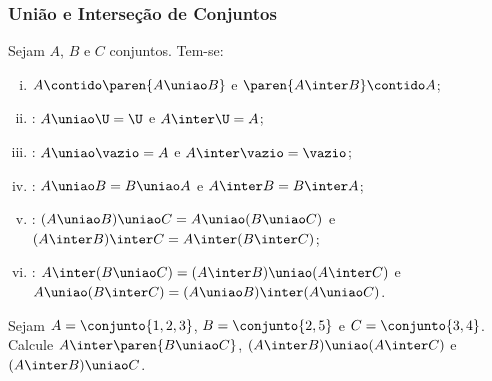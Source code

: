 \begin{frame}
	\frametitle{União e Interseção de Conjuntos} 
	
	\begin{proposicao}
		\label{propuniaoint}
		Sejam $A$, $B$ e $C$ conjuntos. Tem-se:
		\begin{enumerate}[i.]
			\item $A \contido \paren{A \uniao B}$ e $\paren{A \inter B} \contido A$;
			\item {}: $A \uniao \U = \U$ e $A \inter \U = A$;
			\item {}: $A \uniao \vazio = A$ e $A \inter \vazio = \vazio$;
			\item {}: $A \uniao B = B \uniao A$ e $A \inter B = B \inter A$;
			\item {}: $(A \uniao B) \uniao C = A \uniao (B \uniao C)$ e $(A \inter B) \inter C = A \inter (B \inter C)$;
			\item {}: $A \inter
			(B \uniao C) = (A \inter B) \uniao (A \inter C)$ e $A \uniao (B \inter C) = (A \uniao B) \inter (A \uniao C)$.
		\end{enumerate}
	\end{proposicao} \pause



	\begin{exemplo}
		Sejam $A = \conjunto{1, 2, 3}$, $B = \conjunto{2, 5}$ e $C = \conjunto{3, 4}$. Calcule $A \inter \paren{B \uniao C}$, $(A \inter B) \uniao (A \inter C)$ e $(A \inter B) \uniao  C$.
	\end{exemplo}
\end{frame}
